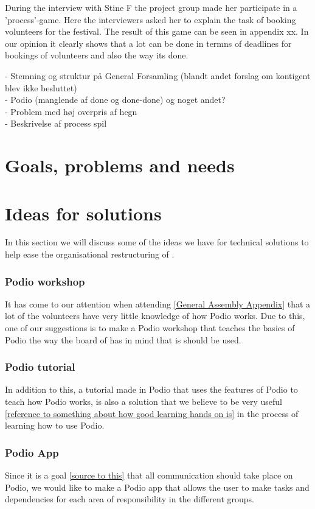 During the interview with Stine F the project group made her participate in a 'process'-game. Here the interviewers asked her to explain the task of booking volunteers for the festival. The result of this game can be seen in appendix xx. In our opinion it clearly shows that a lot can be done in termns of deadlines for bookings of volunteers and also the way its done.

- Stemning og struktur på General Forsamling (blandt andet forslag om kontigent blev ikke besluttet)\\
- Podio (manglende af done og done-done) og noget andet?\\
- Problem med høj overpris af hegn\\
- Beskrivelse af process spil

\section{Goals, problems and needs}


\section{Ideas for solutions}
In this section we will discuss some of the ideas we have for technical
solutions to help ease the organisational restructuring of \mil.

\subsubsection{Podio workshop}
It has come to our attention when attending \ref{General Assembly Appendix} that
a lot of the volunteers have very little knowledge of how Podio works. Due to
this, one of our suggestions is to make a Podio workshop that teaches the basics
of Podio the way the board of \mil has in mind that is should be used.

\subsubsection{Podio tutorial}
In addition to this, a tutorial made in Podio that uses the features of Podio to
teach how Podio works, is also a solution that we believe to be very useful
\ref{reference to something about how good learning hands on is} in the process
of learning how to use Podio.

\subsubsection{Podio App}
Since it is a goal \ref{source to this} that all communication should take place
on Podio, we would like to make a Podio app that allows the user to make tasks
and dependencies for each area of responsibility in the different groups.

